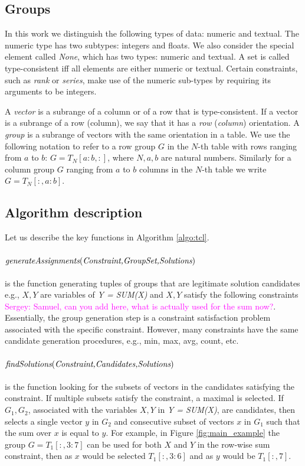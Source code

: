 \documentclass{ecai}
\newcommand{\sergey}[1]{\textcolor{magenta}{{\sc Sergey:} #1}\xspace}
\begin{document}
\subsection{Groups}
In this work we distinguish the following types of data: numeric and textual. The numeric type has two subtypes: integers and floats. We also consider the special element called \textit{None}, which has two types: numeric and textual. A set is called type-consistent iff all elements are either numeric or textual. Certain constraints, such as \textit{rank} or \textit{series}, make use of the numeric sub-types by requiring its arguments to be integers.

A \textit{vector} is a subrange of a column or of a row that is type-consistent. If a vector is a subrange of a row (column), we say that it has a \textit{row} (\textit{column}) orientation. A \textit{group} is a subrange of vectors with the same orientation in a table. We use the following notation to refer to a row group $G$ in the $N$-th table with rows ranging from $a$ to $b$: $G = T_N[a{:}b,:]$, where $N,a,b$ are natural numbers. Similarly for a column group $G$ ranging from $a$ to $b$ columns in the $N$-th table we write $G = T_N[{:},a{:}b]$.

\subsection{Algorithm description}

Let us describe the key functions in Algorithm \ref{algo:tcl}.
\paragraph{$\textit{generateAssignments}(\textit{Constraint,GroupSet,Solutions})$} is the function generating tuples of groups that are legitimate solution candidates e.g., $X,Y$ are variables of \textit{Y = SUM(X)} and $X,Y$ satisfy the following constraints \sergey{Samuel, can you add here, what is actually used for the sum now?}. Essentially, the group generation step is a constraint satisfaction problem associated with the specific constraint. However, many constraints have the same candidate generation procedures, e.g., min, max, avg, count, etc.

\paragraph{$\textit{findSolutions}(\textit{Constraint,Candidates,Solutions})$} is the function looking for the subsets of vectors in the candidates satisfying the constraint. If multiple subsets satisfy the constraint, a maximal is selected. If $G_1,G_2$, associated with the variables $X,Y$ in \textit{Y = SUM(X)}, are candidates, then \findassignment selects a single vector $y$ in $G_2$ and consecutive subset of vectors $x$ in $G_1$ such that the sum over $x$ is equal to $y$. For example, in Figure \ref{fig:main_example} the group $G = T_1[{:},3{:}7]$ can be used for both $X$ and $Y$ in the row-wise sum constraint, then as $x$ would be selected $T_1[{:},3{:}6]$ and as $y$ would be $T_1[{:},7]$.
\end{document}
